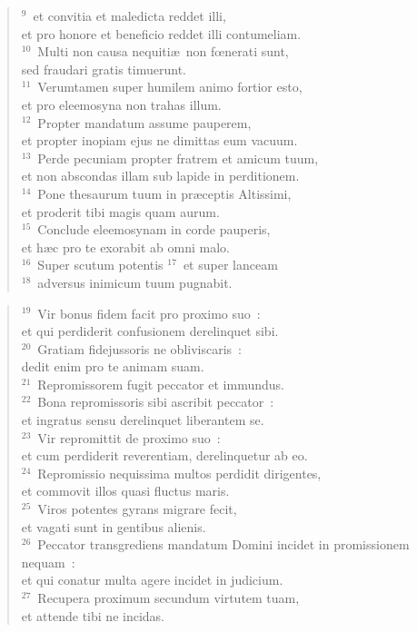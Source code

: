 \begin{flushleft}
\begin{verse}
${}^{9}$~et convitia et maledicta reddet illi,\\ et pro honore et beneficio reddet illi contumeliam.\\
${}^{10}$~Multi non causa nequiti\ae\ non fœnerati sunt,\\ sed fraudari gratis timuerunt.\\
${}^{11}$~Verumtamen super humilem animo fortior esto,\\ et pro eleemosyna non trahas illum.\\
${}^{12}$~Propter mandatum assume pauperem,\\ et propter inopiam ejus ne dimittas eum vacuum.\\
${}^{13}$~Perde pecuniam propter fratrem et amicum tuum,\\ et non abscondas illam sub lapide in perditionem.\\
${}^{14}$~Pone thesaurum tuum in pr\ae ceptis Altissimi,\\ et proderit tibi magis quam aurum.\\
${}^{15}$~Conclude eleemosynam in corde pauperis,\\ et h\ae c pro te exorabit ab omni malo.\\
${}^{16}$~Super scutum potentis
${}^{17}$~et super lanceam\\
${}^{18}$~adversus inimicum tuum pugnabit.\end{verse}\end{flushleft}


\begin{flushleft}\begin{verse}${}^{19}$~Vir bonus fidem facit pro proximo suo~:\\ et qui perdiderit confusionem derelinquet sibi.\\
${}^{20}$~Gratiam fidejussoris ne obliviscaris~:\\ dedit enim pro te animam suam.\\
${}^{21}$~Repromissorem fugit peccator et immundus.\\
${}^{22}$~Bona repromissoris sibi ascribit peccator~:\\ et ingratus sensu derelinquet liberantem se.\\
${}^{23}$~Vir repromittit de proximo suo~:\\ et cum perdiderit reverentiam, derelinquetur ab eo.\\
${}^{24}$~Repromissio nequissima multos perdidit dirigentes,\\ et commovit illos quasi fluctus maris.\\
${}^{25}$~Viros potentes gyrans migrare fecit,\\ et vagati sunt in gentibus alienis.\\
${}^{26}$~Peccator transgrediens mandatum Domini incidet in promissionem nequam~:\\ et qui conatur multa agere incidet in judicium.\\
${}^{27}$~Recupera proximum secundum virtutem tuam,\\ et attende tibi ne incidas.\end{verse}\end{flushleft}


